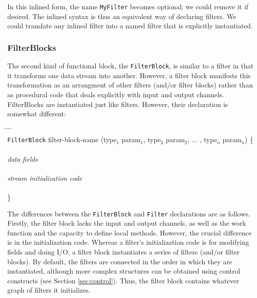 \documentclass[draft]{article}
\begin{document}
In this inlined form, the name {\tt MyFilter} becomes optional; we
could remove it if desired.  The inlined syntax is thus an equivalent
way of declaring filters.  We could translate any inlined filter into
a named filter that is explicitly instantiated.

\subsubsection{FilterBlocks}

The second kind of functional block, the {\tt FilterBlock}, is similar
to a filter in that it transforms one data stream into another.
However, a filter block manifests this transformation as an arrangment
of other filters (and/or filter blocks) rather than as procedural code
that deals explicitly with input and output channels.  FilterBlocks
are instantiated just like filters.  However, their declaration is
somewhat different:

\begin{tabbing}
\hspace{0.2in} \= \hspace{0.2in} \= \hspace{0.2in} \= \hspace{0.2in} \= \\

{\tt FilterBlock} filter-block-name (type$_1$ param$_1$, type$_2$ param$_2$,
... , type$_n$ param$_n$) \{ \\ \\

\> {\it data fields} \\ \\

\> {\it stream initialization code} \\ \\

\}
\end{tabbing}

The differences between the {\tt FilterBlock} and {\tt Filter}
declarations are as follows.  Firstly, the filter block lacks the
input and output channels, as well as the work function and the
capacity to define local methods.  However, the crucial difference is
in the initialization code.  Whereas a filter's initialization code is
for modifying fields and doing I/O, a filter block instantiates a
series of filters (and/or filter blocks).  By default, the filters are
connected in the order in which they are instantiated, although more
complex structures can be obtained using control constructs (see
Section {\ref{sec:control}}).  Thus, the filter block contains whatever
graph of filters it initializes.  
\end{document}
